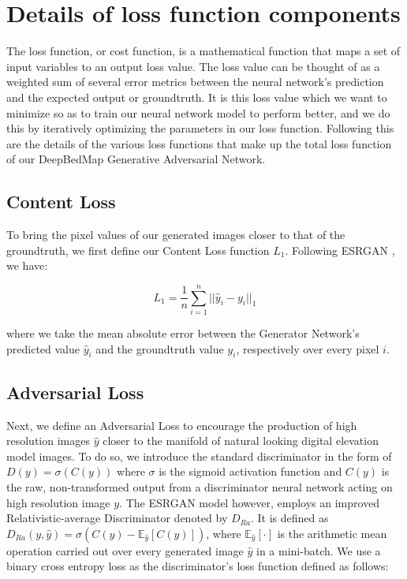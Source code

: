 \documentclass[tc, manuscript]{copernicus}
\begin{document}
\section{Details of loss function components} \label{appendix:A}

The loss function, or cost function, is a mathematical function that maps a set of input variables to an output loss value.
The loss value can be thought of as a weighted sum of several error metrics between the neural network's prediction and the expected output or groundtruth.
It is this loss value which we want to minimize so as to train our neural network model to perform better, and we do this by iteratively optimizing the parameters in our loss function.
Following this are the details of the various loss functions that make up the total loss function of our DeepBedMap Generative Adversarial Network.

\subsection{Content Loss}

To bring the pixel values of our generated images closer to that of the groundtruth, we first define our Content Loss function $L_1$.
Following ESRGAN \citep{WangESRGANEnhancedSuperResolution2018}, we have:

\begin{equation}\label{eq:A1}
  L_1 = \dfrac{1}{n} \sum\limits_{i=1}^n ||\hat{y}_i - y_i||_{1}
\end{equation}

where we take the mean absolute error between the Generator Network's predicted value $\hat{y}_i$ and the groundtruth value $y_i$, respectively over every pixel $i$.

\subsection{Adversarial Loss}

Next, we define an Adversarial Loss to encourage the production of high resolution images $\hat{y}$ closer to the manifold of natural looking digital elevation model images.
To do so, we introduce the standard discriminator in the form of $D(y) = \sigma(C(y))$ where $\sigma$ is the sigmoid activation function and $C(y)$ is the raw, non-transformed output from a discriminator neural network acting on high resolution image $y$.
The ESRGAN model \citep{WangESRGANEnhancedSuperResolution2018} however, employs an improved Relativistic-average Discriminator \citep{Jolicoeur-Martineaurelativisticdiscriminatorkey2018} denoted by $D_{Ra}$.
It is defined as $D_{Ra}(y,\hat{y}) = \sigma(C(y) - \mathbb{E}_{\hat{y}}[C(\hat{y})])$, where $\mathbb{E}_{\hat{y}}[\cdot]$ is the arithmetic mean operation carried out over every generated image $\hat{y}$ in a mini-batch.
We use a binary cross entropy loss as the discriminator's loss function defined as follows:
\end{document}
